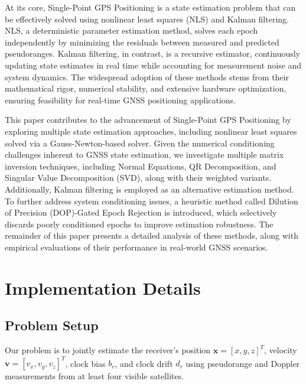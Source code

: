 \documentclass[conference]{IEEEtran}
\begin{document}
At its core, Single-Point GPS Positioning is a state estimation problem that can be effectively solved using nonlinear least squares (NLS) and Kalman filtering. NLS, a deterministic parameter estimation method, solves each epoch independently by minimizing the residuals between measured and predicted pseudoranges. Kalman filtering, in contrast, is a recursive estimator, continuously updating state estimates in real time while accounting for measurement noise and system dynamics. The widespread adoption of these methods stems from their mathematical rigor, numerical stability, and extensive hardware optimization, ensuring feasibility for real-time GNSS positioning applications.

This paper contributes to the advancement of Single-Point GPS Positioning by exploring multiple state estimation approaches, including nonlinear least squares solved via a Gauss-Newton-based solver. Given the numerical conditioning challenges inherent to GNSS state estimation, we investigate multiple matrix inversion techniques, including Normal Equations, QR Decomposition, and Singular Value Decomposition (SVD), along with their weighted variants. Additionally, Kalman filtering is employed as an alternative estimation method. To further address system conditioning issues, a heuristic method called Dilution of Precision (DOP)-Gated Epoch Rejection is introduced, which selectively discards poorly conditioned epochs to improve estimation robustness. The remainder of this paper presents a detailed analysis of these methods, along with empirical evaluations of their performance in real-world GNSS scenarios.

\section{Implementation Details}

\subsection{Problem Setup}

Our problem is to jointly estimate the receiver's position \( \mathbf{x} = [x, y, z]^T \), velocity \( \mathbf{v} = [v_x, v_y, v_z]^T \), clock bias \( b_r \), and clock drift \( d_r \) using pseudorange and Doppler measurements from at least four visible satellites.
\end{document}

